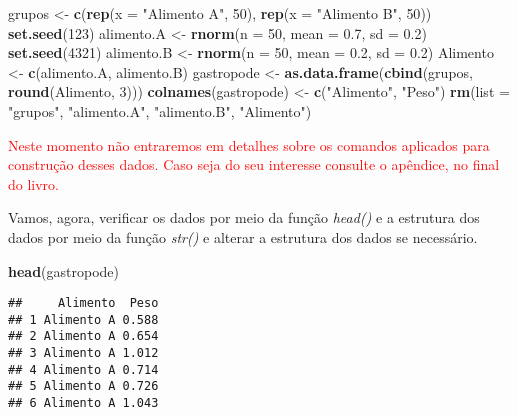 \documentclass[titlepage, oneside, openany, a4paper]{book}
\newenvironment{Shaded}{\begin{snugshade}}{\end{snugshade}}
\newcommand{\DataTypeTok}[1]{\textcolor[rgb]{0.13,0.29,0.53}{#1}}
\newcommand{\DecValTok}[1]{\textcolor[rgb]{0.00,0.00,0.81}{#1}}
\newcommand{\FloatTok}[1]{\textcolor[rgb]{0.00,0.00,0.81}{#1}}
\newcommand{\KeywordTok}[1]{\textcolor[rgb]{0.13,0.29,0.53}{\textbf{#1}}}
\newcommand{\NormalTok}[1]{#1}
\newcommand{\StringTok}[1]{\textcolor[rgb]{0.31,0.60,0.02}{#1}}
\begin{document}
\begin{Shaded}
\begin{Highlighting}[]
\NormalTok{grupos <-}\StringTok{ }\KeywordTok{c}\NormalTok{(}\KeywordTok{rep}\NormalTok{(}\DataTypeTok{x =} \StringTok{"Alimento A"}\NormalTok{, }\DecValTok{50}\NormalTok{), }\KeywordTok{rep}\NormalTok{(}\DataTypeTok{x =} \StringTok{"Alimento B"}\NormalTok{, }\DecValTok{50}\NormalTok{))}
\KeywordTok{set.seed}\NormalTok{(}\DecValTok{123}\NormalTok{)}
\NormalTok{alimento.A <-}\StringTok{ }\KeywordTok{rnorm}\NormalTok{(}\DataTypeTok{n =} \DecValTok{50}\NormalTok{, }\DataTypeTok{mean =} \FloatTok{0.7}\NormalTok{, }\DataTypeTok{sd =} \FloatTok{0.2}\NormalTok{)}
\KeywordTok{set.seed}\NormalTok{(}\DecValTok{4321}\NormalTok{)}
\NormalTok{alimento.B <-}\StringTok{ }\KeywordTok{rnorm}\NormalTok{(}\DataTypeTok{n =} \DecValTok{50}\NormalTok{, }\DataTypeTok{mean =} \FloatTok{0.2}\NormalTok{, }\DataTypeTok{sd =} \FloatTok{0.2}\NormalTok{)}
\NormalTok{Alimento <-}\StringTok{ }\KeywordTok{c}\NormalTok{(alimento.A, alimento.B)}
\NormalTok{gastropode <-}\StringTok{ }\KeywordTok{as.data.frame}\NormalTok{(}\KeywordTok{cbind}\NormalTok{(grupos, }\KeywordTok{round}\NormalTok{(Alimento, }\DecValTok{3}\NormalTok{)))}
\KeywordTok{colnames}\NormalTok{(gastropode) <-}\StringTok{ }\KeywordTok{c}\NormalTok{(}\StringTok{"Alimento"}\NormalTok{, }\StringTok{"Peso"}\NormalTok{)}
\KeywordTok{rm}\NormalTok{(}\DataTypeTok{list =} \StringTok{"grupos"}\NormalTok{, }\StringTok{"alimento.A"}\NormalTok{, }\StringTok{"alimento.B"}\NormalTok{, }\StringTok{"Alimento"}\NormalTok{)}
\end{Highlighting}
\end{Shaded}

\textcolor{red}{Neste momento não entraremos em detalhes sobre os comandos aplicados para construção desses dados. Caso seja do seu interesse consulte o apêndice, no final do livro.}

Vamos, agora, verificar os dados por meio da função \emph{head()} e a estrutura dos dados por meio da função \emph{str()} e alterar a estrutura dos dados se necessário.

\begin{Shaded}
\begin{Highlighting}[]
\KeywordTok{head}\NormalTok{(gastropode)}
\end{Highlighting}
\end{Shaded}

\begin{verbatim}
##     Alimento  Peso
## 1 Alimento A 0.588
## 2 Alimento A 0.654
## 3 Alimento A 1.012
## 4 Alimento A 0.714
## 5 Alimento A 0.726
## 6 Alimento A 1.043
\end{verbatim}
\end{document}
